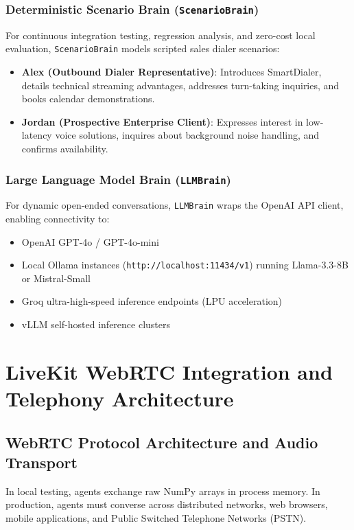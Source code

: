 \documentclass[11pt,a4paper,titlepage]{report}
\begin{document}
\subsection{Deterministic Scenario Brain (\texttt{ScenarioBrain})}
For continuous integration testing, regression analysis, and zero-cost local evaluation, \texttt{ScenarioBrain} models scripted sales dialer scenarios:
\begin{itemize}
    \item \textbf{Alex (Outbound Dialer Representative)}: Introduces SmartDialer, details technical streaming advantages, addresses turn-taking inquiries, and books calendar demonstrations.
    \item \textbf{Jordan (Prospective Enterprise Client)}: Expresses interest in low-latency voice solutions, inquires about background noise handling, and confirms availability.
\end{itemize}

\subsection{Large Language Model Brain (\texttt{LLMBrain})}
For dynamic open-ended conversations, \texttt{LLMBrain} wraps the OpenAI API client, enabling connectivity to:
\begin{itemize}
    \item OpenAI GPT-4o / GPT-4o-mini
    \item Local Ollama instances (\texttt{http://localhost:11434/v1}) running Llama-3.3-8B or Mistral-Small
    \item Groq ultra-high-speed inference endpoints (LPU acceleration)
    \item vLLM self-hosted inference clusters
\end{itemize}

\newpage

\chapter{LiveKit WebRTC Integration and Telephony Architecture}

\section{WebRTC Protocol Architecture and Audio Transport}
In local testing, agents exchange raw NumPy arrays in process memory. In production, agents must converse across distributed networks, web browsers, mobile applications, and Public Switched Telephone Networks (PSTN).
\end{document}
